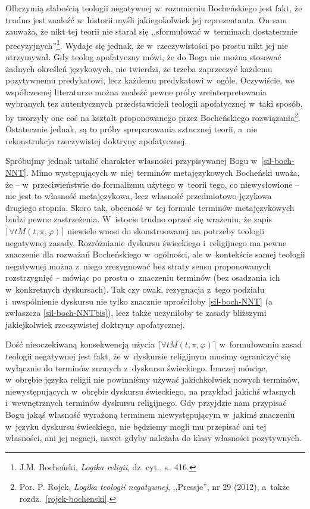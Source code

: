 Olbrzymią słabością teologii negatywnej w~rozumieniu Bocheńskiego jest fakt, że trudno jest znaleźć w~historii myśli jakiegokolwiek jej reprezentanta. On sam zauważa, że nikt tej teorii nie starał się ,,sformułować w~terminach dostatecznie precyzyjnych''\footnote{J.M. Bocheński, \textit{Logika religii}, dz. cyt., s.~416.}. Wydaje się jednak, że w~rzeczywistości po prostu nikt jej nie utrzymywał. Gdy teolog apofatyczny mówi, że do Boga nie można stosować żadnych określeń językowych, nie twierdzi, że trzeba zaprzeczyć każdemu pozytywnemu predykatowi, lecz każdemu predykatowi w~ogóle. Oczywiście, we współczesnej literaturze można znaleźć pewne próby zreinterpretowania wybranych tez autentycznych przedstawicieli teologii apofatycznej w~taki sposób, by tworzyły one coś na kształt proponowanego przez Bocheńskiego rozwiązania\footnote{Por. P. Rojek, \textit{Logika teologii negatywnej}, ,,Pressje'', nr 29 (2012), a~także rozdz.~\ref{rojek-bochenski}.}. Ostatecznie jednak, są to próby spreparowania sztucznej teorii, a~nie rekonstrukcja rzeczywistej doktryny apofatycznej.

Spróbujmy jednak ustalić charakter własności przypisywanej Bogu w~\ref{sil-boch-NNT}. Mimo występujących w~niej terminów metajęzykowych Bocheński uważa, że -- w~przeciwieństwie do formalizmu użytego w~teorii tego, co niewysłowione -- nie jest to własność metajęzykowa, lecz własność przedmiotowo-językowa drugiego stopnia. Skoro tak, obecność w~tej formule terminów metajęzykowych budzi pewne zastrzeżenia. W~istocie trudno oprzeć się wrażeniu, że zapis $\lceil \forall t M(t,\pi,\varphi) \rceil$  niewiele wnosi do skonstruowanej na potrzeby teologii negatywnej zasady. Rozróżnianie dyskursu świeckiego i~religijnego ma pewne znaczenie dla rozważań Bocheńskiego w~ogólności, ale w~kontekście samej teologii negatywnej można z~niego zrezygnować bez straty sensu proponowanych rozstrzygnięć -- mówiąc po prostu o~znaczeniu terminów (bez osadzania ich w~konkretnych dyskursach). Tak czy owak, rezygnacja z~tego podziału i~uwspólnienie dyskursu nie tylko znacznie uprościłoby \ref{sil-boch-NNT} (a zwłaszcza \ref{sil-boch-NNTbis}), lecz także uczyniłoby te zasady bliższymi jakiejkolwiek rzeczywistej doktryny apofatycznej.

Dość nieoczekiwaną konsekwencją użycia $\lceil \forall t M(t,\pi,\varphi) \rceil$ w~formułowaniu zasad teologii negatywnej jest fakt, że w~dyskursie religijnym musimy ograniczyć się wyłącznie do terminów znanych z~dyskursu świeckiego. Inaczej mówiąc, w~obrębie języka religii nie powinniśmy używać jakichkolwiek nowych terminów, niewystępujących w~obrębie dyskursu świeckiego, na przykład jakichś własnych i~wewnętrznych terminów dyskursu religijnego. Gdy przyjdzie nam przypisać Bogu jakąś własność wyrażoną terminem niewystępującym w~jakimś znaczeniu w~języku dyskursu świeckiego, nie będziemy mogli mu przepisać ani tej własności, ani jej negacji, nawet gdyby należała do klasy własności pozytywnych.

